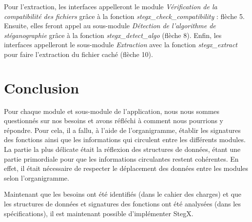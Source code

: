 \documentclass[11pt]{article}
\begin{document}
Pour l'extraction, les interfaces appelleront le module 
\textit{Vérification de la compatibilité des fichiers} grâce à la fonction 
\textit{stegx\_check\_compatibility} : flèche 5. 
Ensuite, elles feront appel au sous-module 
\textit{Détection de l'algorithme de stéganographie} grâce à la fonction 
\textit{stegx\_detect\_algo} (flèche 8).
Enfin, les interfaces appelleront le sous-module \textit{Extraction} avec la 
fonction \textit{stegx\_extract} pour faire l'extraction du fichier caché 
(flèche 10). 

\section{Conclusion}

Pour chaque module et sous-module de l'application, nous nous sommes questionnés
sur nos besoins et avons réfléchi à comment nous pourrions y répondre. Pour
cela, il a fallu, à l'aide de l'organigramme,
établir les signatures des fonctions ainsi que les informations qui circulent
entre les différents modules.  La partie la plus délicate était la réflexion des
structures de données, étant une partie primordiale pour que les informations
circulantes restent cohérentes. En effet, il était nécessaire de respecter le
déplacement des données entre les modules selon l'organigramme. 

Maintenant que les besoins ont été identifiés (dans le cahier des charges) et
que les structures de données et signatures des fonctions ont été analysées
(dans les spécifications), il est maintenant possible d'implémenter StegX. 
\end{document}
